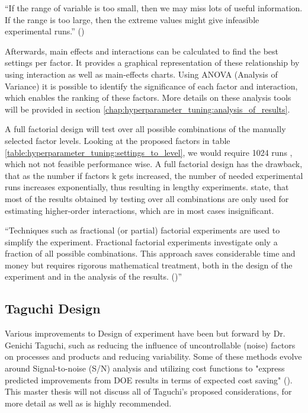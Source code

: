 \enquote{If the range of variable is too small, then we may miss lots of useful information. If the range is too large, then the extreme values might give infeasible experimental runs.} (\cite{yang_design_2009})

Afterwards, main effects and interactions can be calculated to find the best settings per factor. It provides a graphical representation of these relationship by using interaction as well as main-effects charts.
Using ANOVA (Analysis of Variance) it is possible to identify the significance of each factor and interaction, which enables the ranking of these factors. More details on these analysis tools will be provided in section \ref{chap:hyperparameter_tuning:analysis_of_results}.

A full factorial design will test over all possible combinations of the manually selected factor levels. Looking at the proposed factors in table \ref{table:hyperparameter_tuning:settings_to_level}, we would require 1024 runs , which not not feasible performance wise. A full factorial design has the drawback, that as the number if factors k gets increased, the number of needed experimental runs increases exponentially, thus resulting in lengthy experiments. \cite{yang_design_2009} state, that most of the results obtained by testing over all combinations are only used for estimating higher-order interactions, which are in most cases insignificant.

\enquote{Techniques such as fractional (or partial) factorial experiments are used to simplify the experiment. Fractional factorial experiments investigate only a fraction of all possible combinations. This approach saves considerable time and money but requires rigorous mathematical treatment, both in the design of the experiment and in the analysis of the results. (\cite{roy_primer_1990})}


\subsection{Taguchi Design}
Various improvements to Design of experiment have been but forward by Dr. Genichi Taguchi, such as reducing the influence of uncontrollable (noise) factors on processes and products and reducing variability. Some of these methods evolve around Signal-to-noise (S/N) analysis and utilizing cost functions to "express predicted improvements from DOE results in terms of expected cost saving" (\cite{roy_primer_1990}). This master thesis will not discuss all of Taguchi's proposed considerations, for more detail \cite{roy_primer_1990} as well as \cite{yang_design_2009} is highly recommended.

